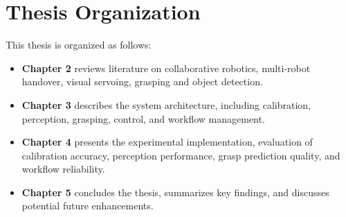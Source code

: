 \section{Thesis Organization}
This thesis is organized as follows:
\begin{itemize}
    \item \textbf{Chapter 2} reviews literature on collaborative robotics, multi-robot handover, visual servoing, grasping and object detection.
    \item \textbf{Chapter 3} describes the system architecture, including calibration, perception, grasping, control, and workflow management.
    \item \textbf{Chapter 4} presents the experimental implementation, evaluation of calibration accuracy, perception performance, grasp prediction quality, and workflow reliability.
    \item \textbf{Chapter 5} concludes the thesis, summarizes key findings, and discusses potential future enhancements.
\end{itemize}

\clearpage
